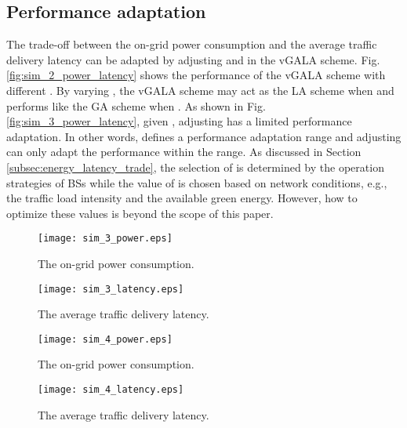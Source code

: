 \documentclass[journal]{IEEEtran}
\theoremstyle{definition}
\begin{document}
\subsection{Performance adaptation}
The trade-off between the on-grid power consumption and the average traffic delivery latency can be adapted by adjusting  and  in the vGALA scheme. Fig. \ref{fig:sim_2_power_latency} shows the performance of the vGALA scheme with different . By varying , the vGALA scheme may act as the LA scheme when  and performs like the GA scheme when . As shown in Fig. \ref{fig:sim_3_power_latency}, given , adjusting  has a limited performance adaptation. In other words,  defines a performance adaptation range and adjusting  can only adapt the performance within the range. As discussed in Section \ref{subsec:energy_latency_trade}, the selection of  is determined by the operation strategies of BSs while the value of  is chosen based on network conditions, e.g., the traffic load intensity and the available green energy. However, how to optimize these values is beyond the scope of this paper.


\begin{figure*}
\centering
\hspace*{\fill}
    \begin{subfigure}[b]{0.5\textwidth}
            \texttt{[image: sim\_3\_power.eps]}
            \caption{The on-grid power consumption.}
            \label{fig:sim_3_power}
    \end{subfigure}\begin{subfigure}[b]{0.5\textwidth}
            \texttt{[image: sim\_3\_latency.eps]}
            \caption{The average traffic delivery latency.}
            \label{fig:sim_3_latency}
   \end{subfigure}\hfill
    \caption{The performance of vGALA with various  ().
     }\label{fig:sim_3_power_latency}
\end{figure*}

\begin{figure*}
\centering
\hspace*{\fill}
    \begin{subfigure}[b]{0.5\textwidth}
            \texttt{[image: sim\_4\_power.eps]}
            \caption{The on-grid power consumption.}
            \label{fig:sim_4_power}
    \end{subfigure}\begin{subfigure}[b]{0.5\textwidth}
            \texttt{[image: sim\_4\_latency.eps]}
            \caption{The average traffic delivery latency.}
            \label{fig:sim_4_latency}
   \end{subfigure}\hfill
       \caption{The performance of vGALA versus solar cell power efficiency (, ).
     }\label{fig:sim_4_power_latency}
   \vspace{-16pt}
\end{figure*}
\end{document}
